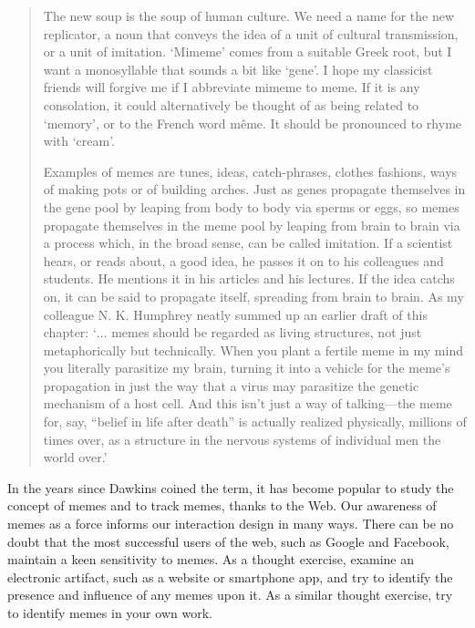 \begin{quotation}
The new soup is the soup of human culture. We need a name for the new replicator, a noun that conveys the idea of a unit of cultural transmission, or a unit of imitation. ‘Mimeme’ comes from a suitable Greek root, but I want a monosyllable that sounds a bit like ‘gene’. I hope my classicist friends will forgive me if I abbreviate mimeme to meme. If it is any consolation, it could alternatively be thought of as being related to ‘memory’, or to the French word même. It should be pronounced to rhyme with ‘cream’.

Examples of memes are tunes, ideas, catch-phrases, clothes fashions, ways of making pots or of building arches. Just as genes propagate themselves in the gene pool by leaping from body to body via sperms or eggs, so memes propagate themselves in the meme pool by leaping from brain to brain via a process which, in the broad sense, can be called imitation. If a scientist hears, or reads about, a good idea, he passes it on to his colleagues and students. He mentions it in his articles and his lectures. If the idea catchs on, it can be said to propagate itself, spreading from brain to brain. As my colleague N. K. Humphrey neatly summed up an earlier draft of this chapter: `$\ldots$ memes should be regarded as living structures, not just metaphorically but technically. When you plant a fertile meme in my mind you literally parasitize my brain, turning it into a vehicle for the meme’s propagation in just the way that a virus may parasitize the genetic mechanism of a host cell. And this isn’t just a way of talking—the meme for, say, “belief in life after death” is actually realized physically, millions of times over, as a structure in the nervous systems of individual men the world over.'
\end{quotation}

In the years since Dawkins coined the term, it has become popular to
study the concept of memes and to track memes, thanks to the Web. Our
awareness of memes as a force informs our interaction design in many
ways. There can be no doubt that the most successful users of the web,
such as Google and Facebook, maintain a keen sensitivity to memes. As a
thought exercise, examine an electronic artifact, such as a website or
smartphone app, and try to identify the presence and influence of any
memes upon it. As a similar thought exercise, try to identify memes in
your own work.

\hypertarget{organizing-information}{%
\label{organizing-information}}

